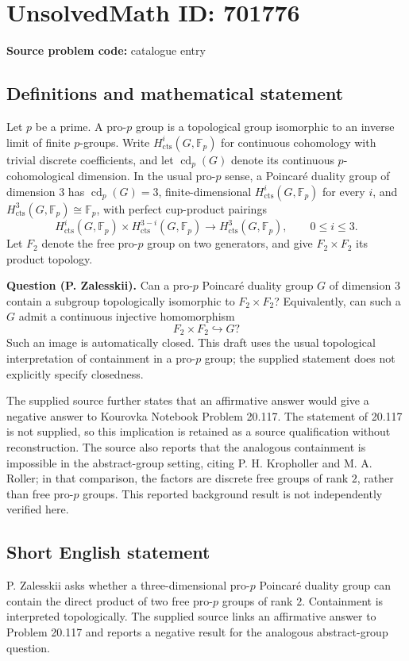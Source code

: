 \documentclass[11pt]{article}
\newcommand{\F}{\mathbb{F}}
\begin{document}
\section*{UnsolvedMath ID: 701776}
\textbf{Source problem code:} catalogue entry
\subsection{Definitions and mathematical statement}
Let \(p\) be a prime. A pro-\(p\) group is a topological group isomorphic to an inverse limit of finite \(p\)-groups. Write \(H^i_{\mathrm{cts}}(G,\F_p)\) for continuous cohomology with trivial discrete coefficients, and let \(\operatorname{cd}_p(G)\) denote its continuous \(p\)-cohomological dimension. In the usual pro-\(p\) sense, a Poincar\'e duality group of dimension \(3\) has \(\operatorname{cd}_p(G)=3\), finite-dimensional \(H^i_{\mathrm{cts}}(G,\F_p)\) for every \(i\), and \(H^3_{\mathrm{cts}}(G,\F_p)\cong\F_p\), with perfect cup-product pairings
\[
H^i_{\mathrm{cts}}(G,\F_p)\times H^{3-i}_{\mathrm{cts}}(G,\F_p)
\longrightarrow H^3_{\mathrm{cts}}(G,\F_p),\qquad 0\leq i\leq 3.
\]
Let \(F_2\) denote the free pro-\(p\) group on two generators, and give \(F_2\times F_2\) its product topology.

\textbf{Question (P. Zalesskii).} Can a pro-\(p\) Poincar\'e duality group \(G\) of dimension \(3\) contain a subgroup topologically isomorphic to \(F_2\times F_2\)? Equivalently, can such a \(G\) admit a continuous injective homomorphism
\[
F_2\times F_2\hookrightarrow G?
\]
Such an image is automatically closed. This draft uses the usual topological interpretation of containment in a pro-\(p\) group; the supplied statement does not explicitly specify closedness.

The supplied source further states that an affirmative answer would give a negative answer to Kourovka Notebook Problem 20.117. The statement of 20.117 is not supplied, so this implication is retained as a source qualification without reconstruction. The source also reports that the analogous containment is impossible in the abstract-group setting, citing P. H. Kropholler and M. A. Roller; in that comparison, the factors are discrete free groups of rank \(2\), rather than free pro-\(p\) groups. This reported background result is not independently verified here.
\subsection{Short English statement}
P. Zalesskii asks whether a three-dimensional pro-\(p\) Poincar\'e duality group can contain the direct product of two free pro-\(p\) groups of rank \(2\). Containment is interpreted topologically. The supplied source links an affirmative answer to Problem 20.117 and reports a negative result for the analogous abstract-group question.
\end{document}
